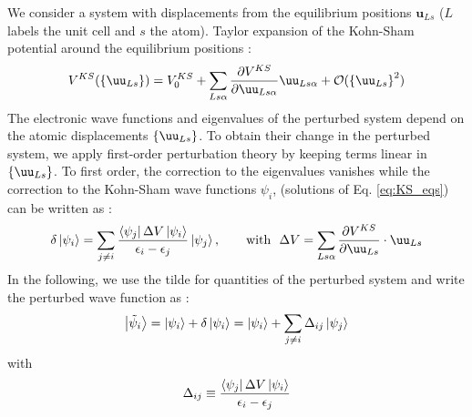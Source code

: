 We consider a system with displacements from the equilibrium positions $\boldsymbol{u}_{Ls}$ ($L$ labels the unit cell and $s$ the atom). Taylor expansion of the Kohn-Sham potential around the equilibrium positions :
\begin{equation}
    V^{KS}(\left\{ \uu_{Ls} \right\}) = V_0^{KS} + \sum_{Ls\alpha} \frac{\partial V^{KS}}{\partial \uu_{Ls\alpha}} \uu_{Ls\alpha} + \mathcal{O}(\left\{ \uu_{Ls} \right\}^2)
\end{equation}
The electronic wave functions and eigenvalues of the perturbed system depend on the atomic displacements $\left\{ \uu_{Ls} \right\}$. To obtain their change in the perturbed system, we apply first-order perturbation theory by keeping terms linear in $\left\{ \uu_{Ls} \right\}$. To first order, the correction to the eigenvalues vanishes while the correction to the Kohn-Sham wave functions $\psi_i$, (solutions of Eq. \eqref{eq:KS_eqs}) can be written as : 
\begin{equation}
    \delta\ket{\psi_i} = \sum_{j\neq i} \frac{\bra{\psi_j} \Delta V \ket{\psi_i}}{\epsilon_i - \epsilon_j} \ket{\psi_j}, \qquad \text{with} \ \ \Delta V = \sum_{Ls\alpha}\frac{\partial V^{KS}}{\partial \uu_{Ls}}\cdot \uu_{Ls}
\end{equation}
In the following, we use the tilde for quantities of the perturbed system and write the perturbed wave function as :
\begin{equation}
    \ket{\tilde{\psi}_i} = \ket{\psi_i} + \delta\ket{\psi_i} = \ket{\psi_i} + \sum_{j \neq i} \Delta_{ij} \ket{\psi_j}
\end{equation}
with
\begin{equation}
    \Delta_{ij} \equiv \frac{\bra{\psi_j} \Delta V \ket{\psi_i}}{\epsilon_i - \epsilon_j}
\end{equation}

